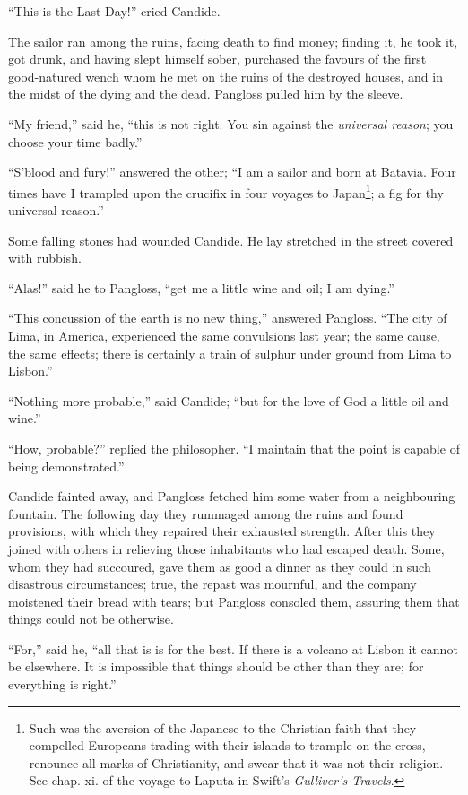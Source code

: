 ``This is the Last Day!'' cried Candide.

The sailor ran among the ruins, facing death to find money; finding it, he took it, got drunk, and having slept himself sober, purchased the favours of the first good-natured wench whom he met on the ruins of the destroyed houses, and in the midst of the dying and the dead. Pangloss pulled him by the sleeve.

``My friend,'' said he, ``this is not right. You sin against the \textit{universal reason}; you choose your time badly.''

``S'blood and fury!'' answered the other; ``I am a sailor and born at Batavia. Four times have I trampled upon the crucifix in four voyages to Japan\footnote{Such was the aversion of the Japanese to the Christian faith that they compelled Europeans trading with their islands to trample on the cross, renounce all marks of Christianity, and swear that it was not their religion. See chap. xi. of the voyage to Laputa in Swift's \textit{Gulliver's Travels}.}; a fig for thy universal reason.''

Some falling stones had wounded Candide. He lay stretched in the street covered with rubbish.

``Alas!'' said he to Pangloss, ``get me a little wine and oil; I am dying.''

``This concussion of the earth is no new thing,'' answered Pangloss. ``The city of Lima, in America, experienced the same convulsions last year; the same cause, the same effects; there is certainly a train of sulphur under ground from Lima to Lisbon.''

``Nothing more probable,'' said Candide; ``but for the love of God a little oil and wine.''

``How, probable?'' replied the philosopher. ``I maintain that the point is capable of being demonstrated.''

Candide fainted away, and Pangloss fetched him some water from a neighbouring fountain. The following day they rummaged among the ruins and found provisions, with which they repaired their exhausted strength. After this they joined with others in relieving those inhabitants who had escaped death. Some, whom they had succoured, gave them as good a dinner as they could in such disastrous circumstances; true, the repast was mournful, and the company moistened their bread with tears; but Pangloss consoled them, assuring them that things could not be otherwise.

``For,'' said he, ``all that is is for the best. If there is a volcano at Lisbon it cannot be elsewhere. It is impossible that things should be other than they are; for everything is right.''

